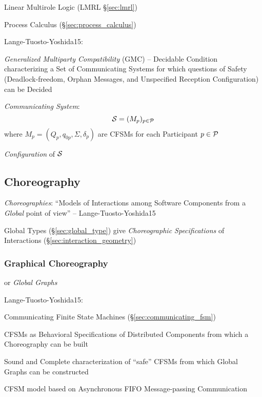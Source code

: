 Linear Multirole Logic (LMRL \S\ref{sec:lmrl})

\fist Process Calculus (\S\ref{sec:process_calculus})

Lange-Tuosto-Yoshida15:

\emph{Generalized Multiparty Compatibility} (GMC) -- Decidable
Condition characterizing a Set of Communicating Systems for which
questions of Safety (Deadlock-freedom, Orphan Messages, and
Unspecified Reception Configuration) can be Decided

\emph{Communicating System}:
\[
  \mathcal{S} = (M_p)_{p \in \mathcal{P}}
\]
where $M_p = (Q_p, q_{0p}, \Sigma, \delta_p)$ are CFSMs for each
Participant $p \in \mathcal{P}$

\emph{Configuration} of $\mathcal{S}$ %



\subsection{Choreography}\label{sec:choreography}

\emph{Choreographies}: ``Models of Interactions among Software
Components from a \emph{Global} point of view'' --
Lange-Tuosto-Yoshida15

\fist Global Types (\S\ref{sec:global_type}) give \emph{Choreographic
  Specifications} of Interactions (\S\ref{sec:interaction_geometry})



\subsubsection{Graphical Choreography}\label{sec:graphical_choreography}

or \emph{Global Graphs}

\begingroup

\newcommand{\party}{\mono}

Lange-Tuosto-Yoshida15:

Communicating Finite State Machines (\S\ref{sec:communicating_fsm})

CFSMs as Behavioral Specifications of Distributed Components from
which a Choreography can be built

Sound and Complete characterization of ``safe'' CFSMs from which
Global Graphs can be constructed

CFSM model based on Asynchronous FIFO Message-passing Communication

